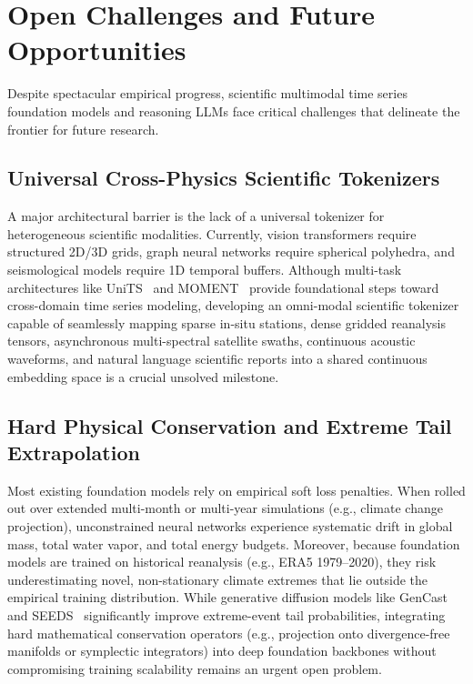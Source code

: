 \section{Open Challenges and Future Opportunities}
\label{sec:future_directions}

Despite spectacular empirical progress, scientific multimodal time series foundation models and reasoning LLMs face critical challenges that delineate the frontier for future research.

\subsection{Universal Cross-Physics Scientific Tokenizers}
A major architectural barrier is the lack of a universal tokenizer for heterogeneous scientific modalities. Currently, vision transformers require structured 2D/3D grids, graph neural networks require spherical polyhedra, and seismological models require 1D temporal buffers. Although multi-task architectures like UniTS~\cite{gao2024units} and MOMENT~\cite{goswami2024moment} provide foundational steps toward cross-domain time series modeling, developing an omni-modal scientific tokenizer capable of seamlessly mapping sparse in-situ stations, dense gridded reanalysis tensors, asynchronous multi-spectral satellite swaths, continuous acoustic waveforms, and natural language scientific reports into a shared continuous embedding space is a crucial unsolved milestone.

\subsection{Hard Physical Conservation and Extreme Tail Extrapolation}
Most existing foundation models rely on empirical soft loss penalties. When rolled out over extended multi-month or multi-year simulations (e.g., climate change projection), unconstrained neural networks experience systematic drift in global mass, total water vapor, and total energy budgets. Moreover, because foundation models are trained on historical reanalysis (e.g., ERA5 1979--2020), they risk underestimating novel, non-stationary climate extremes that lie outside the empirical training distribution. While generative diffusion models like GenCast~\cite{price2023gencast} and SEEDS~\cite{li2024seeds} significantly improve extreme-event tail probabilities, integrating hard mathematical conservation operators (e.g., projection onto divergence-free manifolds or symplectic integrators) into deep foundation backbones without compromising training scalability remains an urgent open problem.

